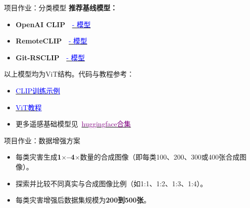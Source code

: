   \begin{refsection}
  \begin{frame}{项目作业：分类模型}
    \textbf{推荐基线模型：}
    \begin{itemize}
      \item \textbf{OpenAI CLIP}~\parencite{radfordLearningTransferableVisual2021}~\href{https://hf-mirror.com/openai/clip-vit-base-patch16}{\textcolor{blue}{- 模型}}
      \item \textbf{RemoteCLIP}~\parencite{liuRemoteCLIPVisionLanguage2024}~\href{https://hf-mirror.com/MVRL/remote-clip-vit-base-patch32}{\textcolor{blue}{- 模型}}
      \item \textbf{Git-RSCLIP}~\parencite{text2earth2025}~\href{https://hf-mirror.com/lcybuaa/Git-RSCLIP-base}{\textcolor{blue}{- 模型}}
    \end{itemize}
    \vspace{0.5em}
    以上模型均为ViT结构。代码与教程参考：
    \begin{itemize}
      \item \href{https://github.com/huggingface/transformers/blob/main/examples/pytorch/contrastive-image-text/README.md}{\textcolor{blue}{CLIP训练示例}}
      \item \href{https://github.com/NielsRogge/Transformers-Tutorials/tree/master/VisionTransformer}{\textcolor{blue}{ViT教程}}
      \item 更多遥感基础模型见~\href{https://hf-mirror.com/collections/MVRL/remote-sensing-foundation-models-664e8fcd67d8ca8c03f42d00}{\textcolor{purple}{huggingface合集}}
    \end{itemize}
    \bottomleftrefs
  \end{frame}
  \end{refsection}
  
  \begin{refsection}
  \begin{frame}{项目作业：数据增强方案}
    \begin{itemize}
      \item 每类灾害生成\textbf{1$\times$--4$\times$}数量的合成图像（即每类100、200、300或400张合成图像）。
      \item 探索并比较不同真实与合成图像比例（如1:1、1:2、1:3、1:4）。
      \item 每类灾害增强后数据集规模为\textbf{200到500张}。
    \end{itemize}
    \bottomleftrefs
  \end{frame}
  \end{refsection}
  
